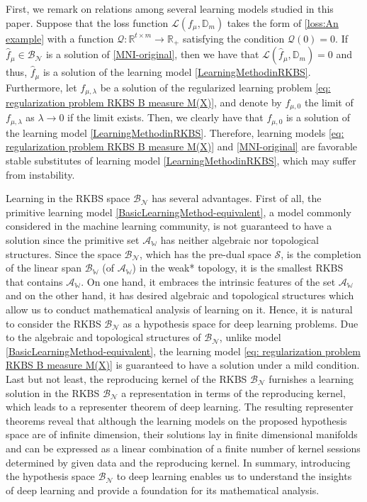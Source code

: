 \documentclass[11pt]{article}
\begin{document}
First, we remark on relations among several learning models studied in this paper.
Suppose that the loss function $\mathcal{L}(f_\mu,\mathbb{D}_m)$ takes the form of \eqref{loss:An example} with a function $\mathcal{Q}:\mathbb{R}^{t\times m}\to \mathbb{R}_+$ satisfying the condition $\mathcal{Q}(0)=0$. If $\hat{f}_\mu\in \mathcal{B}_\mathcal{N}$ is a solution of \eqref{MNI-original}, then we have that $\mathcal{L}(\hat{f}_\mu, \mathbb{D}_m)=0$ and thus, $\hat{f}_\mu$ is a solution
of the learning model \eqref{LearningMethodinRKBS}. Furthermore, let $f_{\mu,\lambda}$ be a solution of the regularized learning problem 
\eqref{eq: regularization problem RKBS B measure M(X)}, and  denote by $f_{\mu,0}$ the limit of $f_{\mu,\lambda}$ as $\lambda\to 0$ if the limit exists. Then, we clearly have that $f_{\mu,0}$ is a solution of the learning model \eqref{LearningMethodinRKBS}. Therefore, learning models \eqref{eq: regularization problem RKBS B measure M(X)} and 
\eqref{MNI-original} are favorable stable substitutes of learning model  \eqref{LearningMethodinRKBS}, which may suffer from instability.

Learning in the RKBS space $\mathcal{B}_{\mathcal{N}}$ has several advantages.
First of all, the primitive learning model \eqref{BasicLearningMethod-equivalent}, a model commonly considered in the machine learning community, is not guaranteed to have a solution since the primitive set $\mathcal{A}_\mathbb{W}$ has neither algebraic nor topological structures. Since the space $\mathcal{B}_\mathcal{N}$, which has the pre-dual space $\mathcal{S}$, is the completion of the linear span $\mathcal{B}_\mathbb{W}$ (of $\mathcal{A}_\mathbb{W}$) in the weak* topology, it is the smallest RKBS that contains $\mathcal{A}_\mathbb{W}$. On one hand, it embraces the intrinsic features of the set $\mathcal{A}_\mathbb{W}$ and on the other hand, it has desired algebraic and topological structures which allow us to conduct mathematical analysis of learning on it. Hence, it is natural to consider the RKBS $\mathcal{B}_\mathcal{N}$ as a hypothesis space for deep learning problems. Due to the algebraic and topological structures of  $\mathcal{B}_\mathcal{N}$, unlike model \eqref{BasicLearningMethod-equivalent}, the learning model \eqref{eq: regularization problem RKBS B measure M(X)} is guaranteed to have a solution under a mild condition.
%
Last but not least, the reproducing kernel of the RKBS $\mathcal{B}_{\mathcal{N}}$ furnishes a learning solution in the RKBS $\mathcal{B}_{\mathcal{N}}$ a representation in terms of the reproducing kernel, which leads to a representer theorem of deep learning. The resulting representer theorems reveal that although the learning models on the proposed hypothesis space are of infinite dimension, their solutions lay in finite dimensional manifolds and can be expressed as a linear combination of a finite number of kernel sessions determined by given data and the reproducing kernel. 
In summary, introducing the hypothesis space $\mathcal{B}_\mathcal{N}$ to deep learning enables us to understand the insights of deep learning and provide a foundation for its mathematical analysis. 
\end{document}
